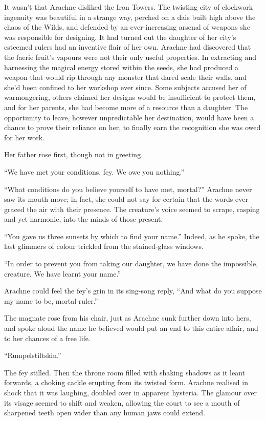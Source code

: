 It wasn’t that Arachne disliked the Iron Towers. The twisting city of clockwork ingenuity was beautiful in a strange way, perched on a dais built high above the chaos of the Wilds, and defended by an ever-increasing arsenal of weapons she was responsible for designing. It had turned out the daughter of her city’s esteemed rulers had an inventive flair of her own. Arachne had discovered that the faerie fruit’s vapours were not their only useful properties. In extracting and harnessing the magical energy stored within the seeds, she had produced a weapon that would rip through any monster that dared scale their walls, and she’d been confined to her workshop ever since. Some subjects accused her of warmongering, others claimed her designs would be insufficient to protect them, and for her parents, she had become more of a resource than a daughter. The opportunity to leave, however unpredictable her destination, would have been a chance to prove their reliance on her, to finally earn the recognition she was owed for her work.

Her father rose first, though not in greeting.

“We have met your conditions, fey. We owe you nothing.”

“What conditions do you believe yourself to have met, mortal?” Arachne never saw its mouth move; in fact, she could not say for certain that the words ever graced the air with their presence. The creature’s voice seemed to scrape, rasping and yet harmonic, into the minds of those present. 

“You gave us three sunsets by which to find your name.” Indeed, as he spoke, the last glimmers of colour trickled from the stained-glass windows.

“In order to prevent you from taking our daughter, we have done the impossible, creature. We have learnt your name.”

Arachne could feel the fey’s grin in its sing-song reply, “And what do you suppose my name to be, mortal ruler.”

The magnate rose from his chair, just as Arachne sunk further down into hers, and spoke aloud the name he believed would put an end to this entire affair, and to her chances of a free life.

“Rumpelstiltskin.”

The fey stilled. Then the throne room filled with shaking shadows as it leant forwards, a choking cackle erupting from its twisted form. Arachne realised in shock that it was laughing, doubled over in apparent hysteria. The glamour over its visage seemed to shift and weaken, allowing the court to see a mouth of sharpened teeth open wider than any human jaws could extend. 

